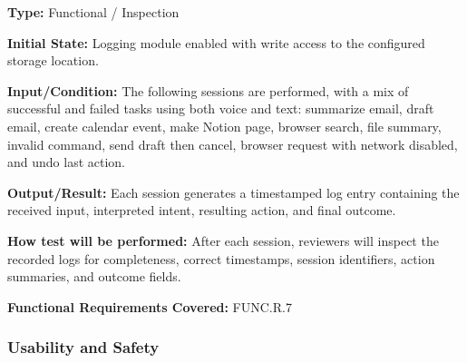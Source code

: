 \documentclass[12pt, titlepage]{article}
\begin{document}
\begin{enumerate}
\textbf{Type:} Functional / Inspection

\textbf{Initial State:} Logging module enabled with write access to the
configured storage location.

\textbf{Input/Condition:} The following sessions are performed, with a
mix of successful and failed tasks using both voice and text:
summarize email, draft email, create calendar event, make Notion page,
browser search, file summary, invalid command, send draft then cancel,
browser request with network disabled, and undo last action.

\textbf{Output/Result:} Each session generates a timestamped log entry
containing the received input, interpreted intent, resulting action, and
final outcome.

\textbf{How test will be performed:} After each session, reviewers will
inspect the recorded logs for completeness, correct timestamps, session
identifiers, action summaries, and outcome fields.

\textbf{Functional Requirements Covered:} FUNC.R.7

\end{enumerate}

\subsubsection{Usability and Safety}
\end{document}
